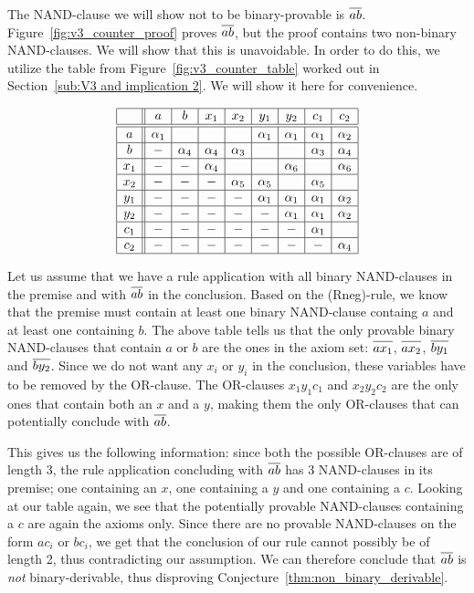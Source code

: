 The NAND-clause we will show not to be binary-provable is $\ol{ab}$.
Figure~\ref{fig:v3_counter_proof} proves $\ol{ab}$, but the proof contains two non-binary NAND-clauses.
We will show that this is unavoidable.
In order to do this, we utilize the table from Figure~\ref{fig:v3_counter_table} worked out in Section~\ref{sub:V3 and implication 2}.
We will show it here for convenience.\par
\begin{figure}[!h]
  \centering
  \[\begin{array}{|c||c|c|c|c|c|c|c|c|}
    \hline
    & a & b & x_1 & x_2 & y_1 & y_2 & c_1 & c_2 \\ \hline\hline
    a & \alpha_1 & & & & \alpha_1 & \alpha_1 & \alpha_1 & \alpha_2 \\ \hline
    b &-& \alpha_4 & \alpha_4 & \alpha_3 & & & \alpha_3 & \alpha_4 \\ \hline
    x_1 &-&-& \alpha_4 & & & \alpha_6 & & \alpha_6 \\ \hline
    x_2 &-&-&-& \alpha_5 & \alpha_5 & & \alpha_5 & \\ \hline
    y_1 &-&-&-&-& \alpha_1 & \alpha_1 & \alpha_1 & \alpha_2 \\ \hline
    y_2 &-&-&-&-&-& \alpha_1 & \alpha_1 & \alpha_2 \\ \hline
    c_1 &-&-&-&-&-&-& \alpha_1 & \\ \hline
    c_2 &-&-&-&-&-&-&-& \alpha_4 \\ \hline
  \end{array}\]
  \caption{}
  \label{fig:open_door_table}
\end{figure}

Let us assume that we have a rule application with all binary NAND-clauses in the premise and with $\ol{ab}$ in the conclusion.
Based on the (Rneg)-rule, we know that the premise must contain at least one binary NAND-clause containg $a$ and at least one containing $b$.
The above table tells us that the only provable binary NAND-clauses that contain $a$ or $b$ are the ones in the axiom set:
$\ol{ax_1}$, $\ol{ax_2}$, $\ol{by_1}$ and $\ol{by_2}$.
Since we do not want any $x_i$ or $y_i$ in the conclusion, these variables have to be removed by the OR-clause.
The OR-clauses $x_1y_1c_1$ and $x_2y_2c_2$ are the only ones that contain both an $x$ and a $y$, making them the only OR-clauses that can potentially conclude with $\ol{ab}$.

This gives us the following information: since both the possible OR-clauses are of length 3, the rule application concluding with $\ol{ab}$ has 3 NAND-clauses in its premise; one containing an $x$, one containing a $y$ and one containing a $c$.
Looking at our table again, we see that the potentially provable NAND-clauses containing a $c$ are again the axioms only.
Since there are no provable NAND-clauses on the form $ac_i$ or $bc_i$, we get that the conclusion of our rule cannot possibly be of length 2, thus contradicting our assumption.
We can therefore conclude that $\ol{ab}$ is \textit{not} binary-derivable, thus disproving Conjecture~\ref{thm:non_binary_derivable}.
